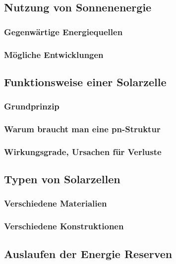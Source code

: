 



\subsection{Nutzung von Sonnenenergie}

	\subsubsection{Gegenwärtige Energiequellen}

	\subsubsection{Mögliche Entwicklungen}


\subsection{Funktionsweise einer Solarzelle}

	\subsubsection{Grundprinzip}

	\subsubsection{Warum braucht man eine pn-Struktur}

	\subsubsection{Wirkungsgrade, Ursachen für Verluste}

\subsection{Typen von Solarzellen}

	\subsubsection{Verschiedene Materialien}

	\subsubsection{Verschiedene Konstruktionen}




\subsection{Auslaufen der Energie Reserven}

